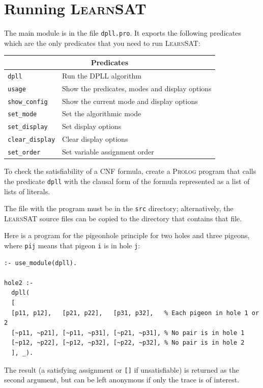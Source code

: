 \documentclass[11pt]{article}
\newcommand*{\p}[1]{\textup{\texttt{#1}}}
\newcommand*{\ls}{\textsc{LearnSAT}}
\newcommand*{\pl}{\textsc{Prolog}}
\begin{document}
\newpage

\section{Running \ls}

The main module is in the file \p{dpll.pro}. It exports the following
predicates which are the only predicates that you need to run \ls{}:

\begin{center}
\begin{tabular}{|l|l|}
\hline
\multicolumn{2}{|c|}{\textbf{\large Predicates}}\\
\hline
\p{dpll}&Run the DPLL algorithm\\
\p{usage}&Show the predicates, modes and display options \\
\p{show\_config}&Show the current mode and display options\\
\p{set\_mode}&Set the algorithmic mode\\
\p{set\_display}&Set display options\\
\p{clear\_display}&Clear display options\\
\p{set\_order}&Set variable assignment order\\
\hline
\end{tabular}
\end{center}

To check the satisfiability of a CNF formula, create a \pl{} program
that calls the predicate \p{dpll} with the clausal form of the formula
represented as a list of lists of literals.

The file with the program must be in the \p{src} directory;
alternatively, the \ls{} source files can be copied to the directory
that contains that file.

Here is a program for the pigeonhole principle for two holes and three
pigeons, where \p{pij} means that pigeon \p{i} is in hole \p{j}:

\begin{verbatim}
:- use_module(dpll).

hole2 :-
  dpll(
  [
  [p11, p12],   [p21, p22],   [p31, p32],   % Each pigeon in hole 1 or 2 
  [~p11, ~p21], [~p11, ~p31], [~p21, ~p31], % No pair is in hole 1
  [~p12, ~p22], [~p12, ~p32], [~p22, ~p32], % No pair is in hole 2
  ], _).
\end{verbatim}

The result (a satisfying assignment or \p{[]} if unsatisfiable) is
returned as the second argument, but can be left anonymous if only
the trace is of interest.
\end{document}
